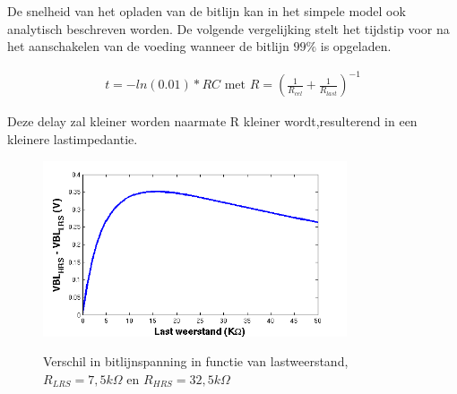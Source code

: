 De snelheid van het opladen van de bitlijn kan in het simpele model ook analytisch beschreven worden. De volgende vergelijking stelt het tijdstip voor na het aanschakelen van de voeding wanneer de bitlijn $99\%$ is opgeladen.

\begin{align}
t = -ln(0.01)*RC \text{ met } R = (\frac{1}{R_{cel}} + \frac{1}{R_{last}})^{-1}
\end{align}

Deze delay zal kleiner worden naarmate R kleiner wordt,resulterend in een kleinere lastimpedantie.

\begin{figure}[!ht]
\centering
 \includegraphics[width=0.80\textwidth] {../fig/hfdst-last-rpiek.png} \label{fig:rpiek}
\caption[Verschil in bitlijnspanning in functie van lastweerstand]{Verschil in bitlijnspanning in functie van lastweerstand, $R_{LRS}=7,5 k \Omega$ en $R_{HRS}= 32,5 k \Omega$}
\end{figure}




